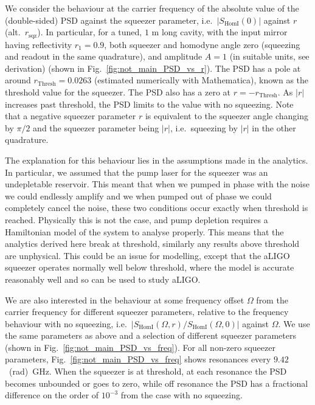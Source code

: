 \documentclass[aps,pra,superscriptaddress,reprint,nofootinbib]{revtex4-1}
\newcommand{\abs}[1]{\left\lvert #1 \right\rvert}
\begin{document}
We consider the behaviour at the carrier frequency of the absolute value of the (double-sided) PSD against the squeezer parameter, i.e.\ $\abs{S_{\mathrm{HomI}}(0)}$ against $r$ (alt.\ $r_\mathrm{sqz}$). In particular, for a tuned, $1$ m long cavity, with the input mirror having reflectivity $r_1 = 0.9$, both squeezer and homodyne angle zero (squeezing and readout in the same quadrature), and amplitude $A = 1$ (in suitable units, see derivation) (shown in Fig.~\ref{fig:not_main_PSD_vs_r}). The PSD has a pole at around $r_\mathrm{Thresh} = 0.0263$ (estimated numerically with Mathematica), known as the threshold value for the squeezer. The PSD also has a zero at $r = -r_\mathrm{Thresh}$. As $\abs{r}$ increases past threshold, the PSD limits to the value with no squeezing. Note that a negative squeezer parameter $r$ is equivalent to the squeezer angle changing by $\pi/2$ and the squeezer parameter being $\abs{r}$, i.e.\ squeezing by $\abs{r}$ in the other quadrature.


The explanation for this behaviour lies in the assumptions made in the analytics. In particular, we assumed that the pump laser for the squeezer was an undepletable reservoir. This meant that when we pumped in phase with the noise we could endlessly amplify and we when pumped out of phase we could completely cancel the noise, these two conditions occur exactly when threshold is reached. Physically this is not the case, and pump depletion requires a Hamiltonian model of the system to analyse properly. This means that the analytics derived here break at threshold, similarly any results above threshold are unphysical.
This could be an issue for modelling, except that the aLIGO squeezer operates normally well below threshold, where the model is  accurate reasonably well and so can be used to study aLIGO.


We are also interested in the behaviour at some frequency offset $\Omega$ from the carrier frequency for different squeezer parameters, relative to the frequency behaviour with no squeezing, i.e.\ $\abs{S_{\mathrm{HomI}}(\Omega, r)/S_{\mathrm{HomI}}(\Omega, 0)}$ against $\Omega$. We use the same parameters as above and a selection of different squeezer parameters (shown in Fig.~\ref{fig:not_main_PSD_vs_freq}). For all non-zero squeezer parameters, Fig.~\ref{fig:not_main_PSD_vs_freq} shows resonances every $9.42$~(rad)~GHz. When the squeezer is at threshold, at each resonance the PSD becomes unbounded or goes to zero, while off resonance the PSD has a fractional difference on the order of $10^{-3}$ from the case with no squeezing.
\end{document}
